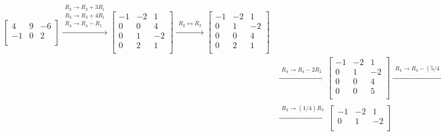 \documentclass{article}
\begin{document}
\begin{itemize}
\begin{align*}
\begin{bmatrix}
 4 &  9 & -6 \\
-1 &  0 &  2 \\ 
\end{bmatrix} \xrightarrow{\begin{array}{c} R_2 \rightarrow R_2 + 3R_1 \\ R_3 \rightarrow R_3 + 4R_1 \\ R_4 \rightarrow R_4 - R_1 \end{array}} \begin{bmatrix}
-1 & -2 &  1 \\
 0 &  0 &  4 \\
 0 &  1 & -2 \\
 0 &  2 &  1 \\ 
\end{bmatrix} \xrightarrow{\begin{array}{c} R_2 \leftrightarrow R_3 \end{array}} \begin{bmatrix}
-1 & -2 &  1 \\
 0 &  1 & -2 \\
 0 &  0 &  4 \\
 0 &  2 &  1 \\ 
\end{bmatrix} \\ 
& \xrightarrow{\begin{array}{c} R_4 \rightarrow R_4 - 2R_2 \end{array}} \begin{bmatrix}
-1 & -2 &  1 \\
 0 &  1 & -2 \\
 0 &  0 &  4 \\
 0 &  0 &  5 \\ 
\end{bmatrix} \xrightarrow{\begin{array}{c} R_4 \rightarrow R_4 - (5/4)R_3 \end{array}} \begin{bmatrix}
-1 & -2 &  1 \\
 0 &  1 & -2 \\
 0 &  0 &  4 \\
 0 &  0 &  0 \\ 
\end{bmatrix} \\ 
& \xrightarrow{\begin{array}{c} R_3 \rightarrow (1/4)R_3 \end{array}} \begin{bmatrix}
-1 & -2 &  1 \\
 0 &  1 & -2 \\

\end{bmatrix}
\end{align*}
\end{itemize}
\end{document}
